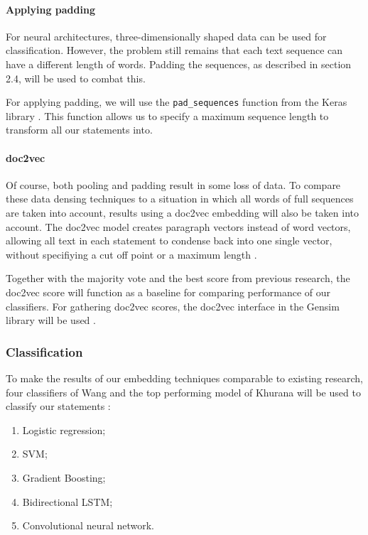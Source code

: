 \paragraph{Applying padding}
For neural architectures, three-dimensionally shaped data can be used for classification. 
However, the problem still remains that each text sequence can have a different length of words. 
Padding the sequences, as described in section 2.4, will be used to combat this.

For applying padding, we will use the \texttt{pad\_sequences} function from the Keras library \cite{keraspad}. 
This function allows us to specify a maximum sequence length to transform all our statements into.

\paragraph{doc2vec}
Of course, both pooling and padding result in some loss of data.
To compare these data densing techniques to a situation in which all words of full sequences are taken into account, results using a doc2vec embedding will also be taken into account.
The doc2vec model creates paragraph vectors instead of word vectors, allowing all text in each statement to condense back into one single vector, without specifiying a cut off point or a maximum length \cite{le2014}.

Together with the majority vote and the best score from previous research, the doc2vec score will function as a baseline for comparing performance of our classifiers.
For gathering doc2vec scores, the doc2vec interface in the Gensim library will be used \cite{gensim}. 

\subsubsection{Classification}
To make the results of our embedding techniques comparable to existing research, four classifiers of Wang and the top performing model of Khurana will be used to classify our statements \cite{wang2018}\cite{khurana2017}:

\begin{enumerate}
    \item Logistic regression;
    \item SVM;
    \item Gradient Boosting;
    \item Bidirectional LSTM;
    \item Convolutional neural network.
\end{enumerate}

